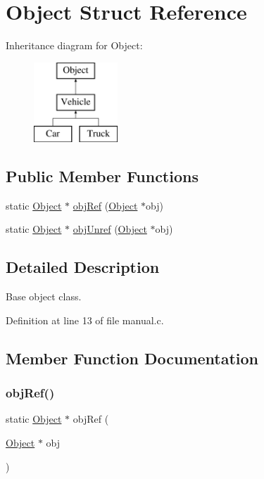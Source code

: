 \hypertarget{struct_object}{}\section{Object Struct Reference}
\label{struct_object}
Inheritance diagram for Object\+:\begin{figure}[H]
\begin{center}
\leavevmode
\includegraphics[height=3.000000cm]{struct_object}
\end{center}
\end{figure}
\subsection*{Public Member Functions}
\begin{DoxyCompactItemize}
\item 
static \hyperlink{struct_object}{Object} $\ast$ \hyperlink{struct_object_a71225073d06a793b9a6ea9263ed37b12}{obj\+Ref} (\hyperlink{struct_object}{Object} $\ast$obj)
\item 
static \hyperlink{struct_object}{Object} $\ast$ \hyperlink{struct_object_a924ee0cecc906d148022b3f0d6325cfb}{obj\+Unref} (\hyperlink{struct_object}{Object} $\ast$obj)
\end{DoxyCompactItemize}


\subsection{Detailed Description}
Base object class. 

Definition at line 13 of file manual.\+c.



\subsection{Member Function Documentation}
\mbox{\label{struct_object_a71225073d06a793b9a6ea9263ed37b12}} 
\subsubsection{\texorpdfstring{obj\+Ref()}{objRef()}}
{\footnotesize\ttfamily static \hyperlink{struct_object}{Object} $\ast$ obj\+Ref (\begin{DoxyParamCaption}\item[{\hyperlink{struct_object}{Object} $\ast$}]{obj }\end{DoxyParamCaption})}

